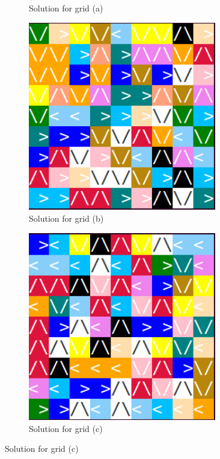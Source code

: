 \documentclass{scrartcl}
\begin{document}
\begin{figure}
\begin{subfigure}{0.5\textwidth}
			\caption{Solution for grid (a)}
			\label{robot-grid-a-solution}
		\end{subfigure}
		\begin{subfigure}{0.5\textwidth}
			\includegraphics[width=0.9\textwidth]{resources/Screenshot from 2022-11-21 12-21-43.png}
			\caption{Solution for grid (b)}
			\label{robot-grid-b-solution}
		\end{subfigure}
		\begin{subfigure}{0.5\textwidth}
			\includegraphics[width=0.9\textwidth]{resources/Screenshot from 2022-11-21 12-23-17.png}
			\caption{Solution for grid (c)}
			\label{robot-grid-c-solution}
		\end{subfigure}

	\end{figure}
\end{document}
